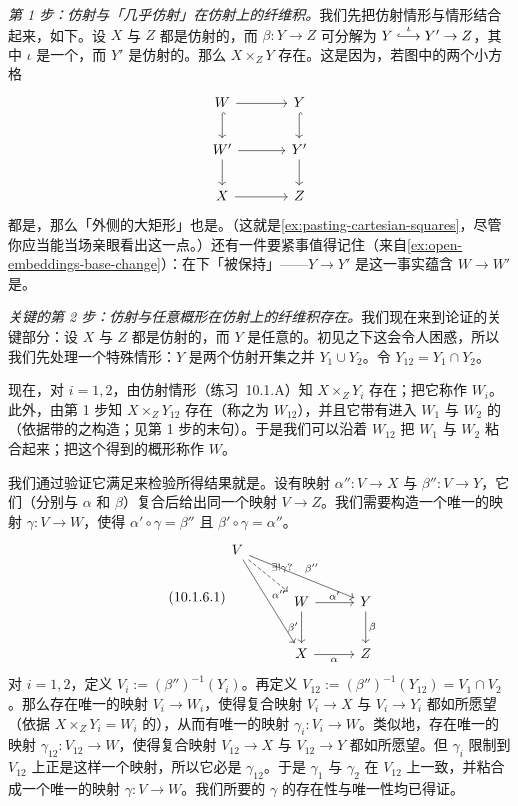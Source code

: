 \emph{第 1 步：仿射与「几乎仿射」在仿射上的纤维积。}\quad 我们先把仿射情形与\trOpenEmbedding{}情形结合起来，如下。设 $X$ 与 $Z$ 都是仿射的，而 $\beta\colon Y\to Z$ 可分解为 $Y\overset{\iota}{\lhook\joinrel\longrightarrow}Y'\to Z$，其中 $\iota$ 是一个\trOpenEmbedding，而 $Y'$ 是仿射的。那么 $X\times_Z Y$ 存在。这是因为，若图中的两个小方格
\[
\begin{tikzcd}[row sep=1.9em, column sep=3.4em]
W \ar[r] \ar[d, hook, "\text{\trOpen}"'] & Y \ar[d, hook, "\text{\trOpen}"] \\
W' \ar[r] \ar[d] & Y' \ar[d] \\
X \ar[r] & Z
\end{tikzcd}
\]
都是\trCartesianDiagram，那么「外侧的大矩形」也是\trCartesianDiagram。（这就是\cref{ex:pasting-cartesian-squares}，尽管你应当能当场亲眼看出这一点。）还有一件要紧事值得记住（来自\cref{ex:open-embeddings-base-change}）：\trOpenEmbedding{}在\trFiberProduct{}下「被保持」——$Y\to Y'$ 是\trOpenEmbedding{}这一事实蕴含 $W\to W'$ 是\trOpenEmbedding。

\emph{关键的第 2 步：仿射与任意概形在仿射上的纤维积存在。}\quad 我们现在来到论证的关键部分：设 $X$ 与 $Z$ 都是仿射的，而 $Y$ 是任意的。初见之下这会令人困惑，所以我们先处理一个特殊情形：$Y$ 是两个仿射开集之并 $Y_1\cup Y_2$。令 $Y_{12}=Y_1\cap Y_2$。

现在，对 $i=1,2$，由仿射情形（\mbox{练习~10.1.A}）知 $X\times_Z Y_i$ 存在；把它称作 $W_i$。此外，由第 1 步知 $X\times_Z Y_{12}$ 存在（称之为 $W_{12}$），并且它带有进入 $W_1$ 与 $W_2$ 的\trCanonical\trOpenEmbedding（依据带\trOpenEmbedding{}的\trFiberProduct{}之构造；见第 1 步的末句）。于是我们可以沿着 $W_{12}$ 把 $W_1$ 与 $W_2$ 粘合起来；把这个得到的概形称作 $W$。

我们通过验证它满足\trUniversalProperty{}来检验所得结果就是\trFiberProduct。设有映射 $\alpha''\colon V\to X$ 与 $\beta''\colon V\to Y$，它们（分别与 $\alpha$ 和 $\beta$）复合后给出同一个映射 $V\to Z$。我们需要构造一个唯一的映射 $\gamma\colon V\to W$，使得 $\alpha'\circ\gamma=\beta''$ 且 $\beta'\circ\gamma=\alpha''$。
\begin{equation*}\tag{10.1.6.1}\label{eq:step-two-universal-map}
\begin{tikzcd}[row sep=2.3em, column sep=2.8em]
V \ar[drr, "\beta''"] \ar[dr, dashed, "\exists!\gamma?"] \ar[ddr, "\alpha''"] & & \\
& W \ar[r, "\alpha'"] \ar[d, "\beta'"'] & Y \ar[d, "\beta"] \\
& X \ar[r, "\alpha"'] & Z
\end{tikzcd}
\end{equation*}
对 $i=1,2$，定义 $V_i:=(\beta'')^{-1}(Y_i)$。再定义 $V_{12}:=(\beta'')^{-1}(Y_{12})=V_1\cap V_2$。那么存在唯一的映射 $V_i\to W_i$，使得复合映射 $V_i\to X$ 与 $V_i\to Y_i$ 都如所愿望（依据\trFiberProduct{} $X\times_Z Y_i=W_i$ 的\trUniversalProperty），从而有唯一的映射 $\gamma_i\colon V_i\to W$。类似地，存在唯一的映射 $\gamma_{12}\colon V_{12}\to W$，使得复合映射 $V_{12}\to X$ 与 $V_{12}\to Y$ 都如所愿望。但 $\gamma_i$ 限制到 $V_{12}$ 上正是这样一个映射，所以它必是 $\gamma_{12}$。于是 $\gamma_1$ 与 $\gamma_2$ 在 $V_{12}$ 上一致，并粘合成一个唯一的映射 $\gamma\colon V\to W$。我们所要的 $\gamma$ 的存在性与唯一性均已得证。

